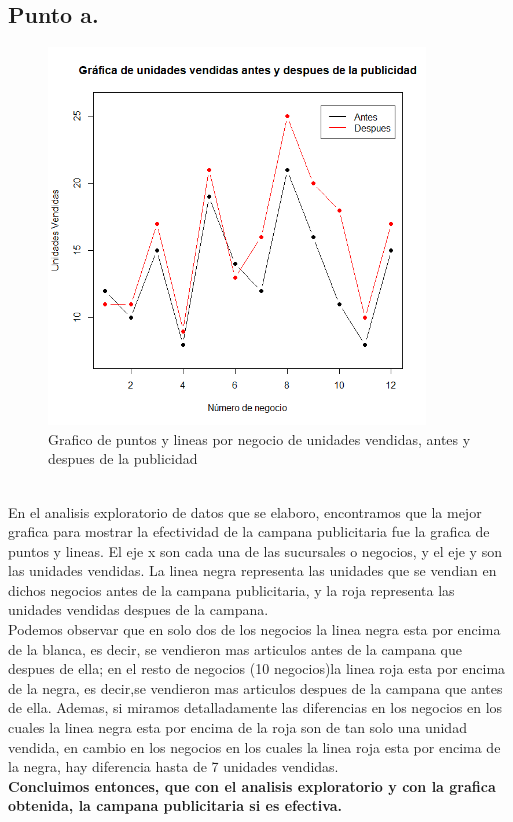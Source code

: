 \documentclass[letterpaper,12pt,onecolumn,titlepage]{article}
\begin{document}
\subsection{Punto a.}
 \begin{figure}[!h]
    \begin{center}
        \includegraphics[width=10cm]{Figuras/Grafico2.png}
        \caption{Grafico de puntos y lineas por negocio de unidades vendidas, antes y despues de la publicidad}
        \label{fig:Densidad}
    \end{center}
\end{figure}

~\\ En el analisis exploratorio de datos que se elaboro, encontramos que la mejor grafica para mostrar la efectividad de la campana publicitaria fue la grafica de puntos y lineas. El eje x son cada una de las sucursales o negocios, y el eje y son las unidades vendidas. La linea negra representa las unidades que se vendian en dichos negocios antes de la campana publicitaria, y la roja representa las unidades vendidas despues de la campana.
~\\ Podemos observar que en solo dos de los negocios la linea negra esta por encima de la blanca, es decir, se vendieron mas articulos antes de la campana que despues de ella; en el resto de negocios (10 negocios)la linea roja esta por encima de la negra, es decir,se vendieron mas articulos despues de la campana que antes de ella. Ademas, si miramos detalladamente las diferencias en los negocios en los cuales la linea negra esta por encima de la roja son de tan solo una unidad vendida, en cambio en los negocios en los cuales la linea roja esta por encima de la negra, hay diferencia hasta de 7 unidades vendidas.
~\\ \textbf{Concluimos entonces, que con el analisis exploratorio y con la grafica obtenida, la campana publicitaria si es efectiva.}
\end{document}
